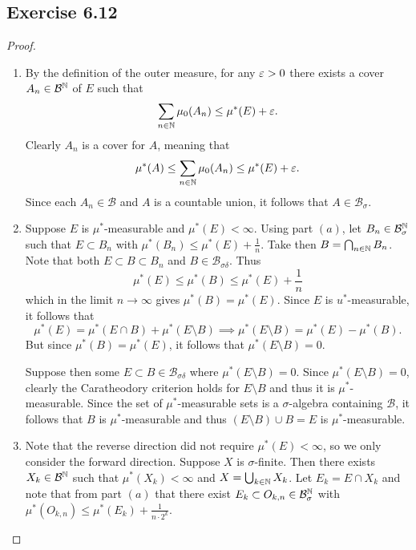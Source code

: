 \documentclass[hw_all.tex]{subfiles}
\begin{document}
\subsection{Exercise 6.12}

\begin{proof}
    \begin{enumerate}
        \item
            By the definition of the outer measure, for any $\varepsilon > 0$ there exists a cover $A_n \in \mathcal{B}^{\mathbb{N}}$ of $E$ such that
            \[
                \sum_{n \in \mathbb{N}} \mu_0(A_n) \leq \mu^*(E) + \varepsilon
            .\]
            Clearly $A_n$ is a cover for $A$, meaning that
            \[
                \mu^*(A) \leq \sum_{n \in \mathbb{N}} \mu_0(A_n) \leq \mu^*(E) + \varepsilon
            .\]
            Since each $A_n \in \mathcal{B}$ and $A$ is a countable union, it follows that $A \in \mathcal{B}_{\sigma}$.

        \item
            Suppose $E$ is $\mu^*$-measurable and $\mu^*(E) < \infty$. Using part $(a)$, let $B_n \in \mathcal{B}_{\sigma}^{\mathbb{N}}$ such that $E \subset B_n$ with $\mu^*(B_n) \leq \mu^*(E) + \frac{1}{n}$. Take then $B = \bigcap_{n \in \mathbb{N}} B_n$. Note that both $E \subset B \subset B_n$ and $B \in \mathcal{B}_{\sigma \delta}$. Thus
            \[
                \mu^*(E) \leq \mu^*(B) \leq \mu^*(E) + \frac{1}{n}
            \]
            which in the limit $n \to \infty$ gives $\mu^*(B) = \mu^*(E)$. Since $E$ is $u^*$-measurable, it follows that
            \[
                \mu^*(E) = \mu^*(E \cap B) + \mu^*(E \setminus B) \implies \mu^*(E \setminus B) = \mu^*(E) - \mu^*(B)
            .\]
            But since $\mu^*(B) = \mu^*(E)$, it follows that $\mu^*(E \setminus B) = 0$.

            Suppose then some $E \subset B \in \mathcal{B}_{\sigma \delta}$ where $\mu^*(E \setminus B) = 0$. Since $\mu^*(E \setminus B) = 0$, clearly the Caratheodory criterion holds for $E \setminus B$ and thus it is $\mu^*$-measurable. Since the set of $\mu^*$-measurable sets is a $\sigma$-algebra containing $\mathcal{B}$, it follows that $B$ is $\mu^*$-measurable and thus $(E \setminus B) \cup B = E$ is $\mu^*$-measurable.

        \item 
            Note that the reverse direction did not require $\mu^*(E) < \infty$, so we only consider the forward direction. Suppose $X$ is $\sigma$-finite. Then there exists $X_k \in \mathcal{B}^{\mathbb{N}}$ such that $\mu^*(X_k) < \infty$ and $X = \bigcup_{k \in \mathbb{N}} X_k$. Let $E_k = E \cap X_k$ and note that from part $(a)$ that there exist $E_k \subset O_{k,n} \in \mathcal{B}_{\sigma}^{\mathbb{N}}$ with $\mu^*(O_{k,n}) \leq \mu^*(E_k) + \frac{1}{n \cdot 2^k}$. 


\end{enumerate}
\end{proof}
\end{document}
